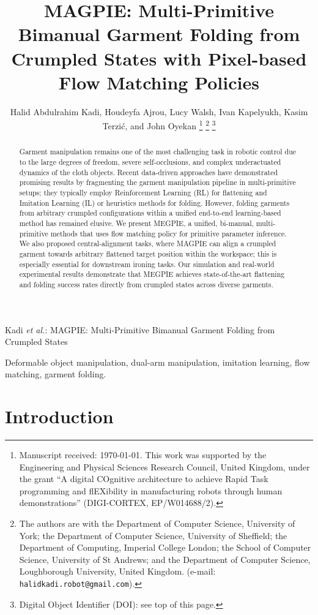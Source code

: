 \documentclass[journal]{IEEEtran}
\title{\magpie MAGPIE: Multi-Primitive Bimanual Garment Folding from Crumpled States with Pixel-based Flow Matching Policies}
\author{Halid Abdulrahim Kadi, Houdeyfa Ajrou, Lucy Walsh, Ivan Kapelyukh,
        Kasim Terzi{\'c}, and John Oyekan%
\thanks{Manuscript received: \today. This work was supported by the
Engineering and Physical Sciences Research Council, United Kingdom, under
the grant ``A digital COgnitive architecture to achieve Rapid Task
programming and flEXibility in manufacturing robots through human
demonstrations'' (DIGI-CORTEX, EP/W014688/2).}%
\thanks{The authors are with the Department of Computer Science, University
of York; the Department of Computer Science, University of Sheffield; the
Department of Computing, Imperial College London; the School of Computer
Science, University of St Andrews; and the Department of Computer Science,
Loughborough University, United Kingdom. (e-mail:
\texttt{halidkadi.robot@gmail.com}).}%
\thanks{Digital Object Identifier (DOI): see top of this page.}}
\begin{document}
%
{Kadi \MakeLowercase{\textit{et al.}}: MAGPIE: Multi-Primitive Bimanual Garment Folding from Crumpled States}

\maketitle
\begin{abstract}

Garment manipulation remains one of the most challenging task in robotic control due to the large degrees of freedom, severe self-occlusions, and complex underactuated dynamics of the cloth objects. Recent data-driven approaches have demonstrated promising results by fragmenting the garment manipulation pipeline in multi-primitive setups; they typically employ Reinforcement Learning (RL) for flattening and Imitation Learning (IL) or heuristics methods for folding. However, folding garments from arbitrary crumpled configurations within a unified end-to-end learning-based method has remained elusive. We present MEGPIE, a unified, bi-manual, multi-primitive methods that uses flow matching policy for primitive parameter inference. We also proposed central-alignment tasks, where MAGPIE can align a crumpled garment towards arbitrary flattened target position within the workspace; this is especially essential for downstream ironing tasks. Our simulation and real-world experimental results demonstrate that MEGPIE achieves state-of-the-art flattening and folding success rates directly from crumpled states across diverse garments.
\end{abstract}

\begin{IEEEkeywords}
Deformable object manipulation, dual-arm manipulation, imitation learning, flow matching, garment folding.
\end{IEEEkeywords}

\IEEEpeerreviewmaketitle

\section{Introduction}
\end{document}
